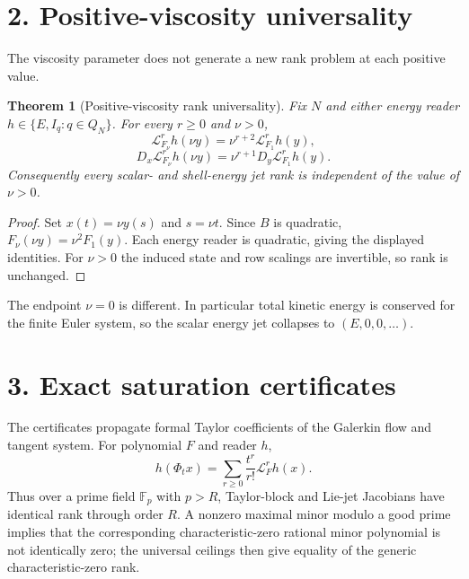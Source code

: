 \documentclass[10pt,leqno,twoside]{article}
\newcommand{\F}{\mathbb F}
\newcommand{\Lie}{\mathcal L}
\theoremstyle{plain}
\newtheorem{theorem}{Theorem}
\theoremstyle{remark}
\begin{document}
\section*{2. Positive-viscosity universality}

The viscosity parameter does not generate a new rank problem at each positive value.

\begin{theorem}[Positive-viscosity rank universality]
Fix $N$ and either energy reader $h\in\{E,I_q:q\in Q_N\}$.  For every $r\ge0$ and $\nu>0$,
\begin{equation}
\Lie_{F_\nu}^r h(\nu y)=\nu^{r+2}\Lie_{F_1}^r h(y),
\end{equation}
\begin{equation}
D_x\Lie_{F_\nu}^r h(\nu y)=\nu^{r+1}D_y\Lie_{F_1}^r h(y).
\end{equation}
Consequently every scalar- and shell-energy jet rank is independent of the value of
$\nu>0$.
\end{theorem}

\begin{proof}
Set $x(t)=\nu y(s)$ and $s=\nu t$.  Since $B$ is quadratic,
$F_\nu(\nu y)=\nu^2F_1(y)$.  Each energy reader is quadratic, giving the displayed identities.
For $\nu>0$ the induced state and row scalings are invertible, so rank is unchanged.
\end{proof}

The endpoint $\nu=0$ is different.  In particular total kinetic energy is conserved for the
finite Euler system, so the scalar energy jet collapses to $(E,0,0,\ldots)$.

\section*{3. Exact saturation certificates}

The certificates propagate formal Taylor coefficients of the Galerkin flow and tangent
system.  For polynomial $F$ and reader $h$,
\begin{equation}
h(\Phi_t x)=\sum_{r\ge0}\frac{t^r}{r!}\Lie_F^r h(x).
\end{equation}
Thus over a prime field $\F_p$ with $p>R$, Taylor-block and Lie-jet Jacobians have identical
rank through order $R$.  A nonzero maximal minor modulo a good prime implies that the
corresponding characteristic-zero rational minor polynomial is not identically zero; the
universal ceilings then give equality of the generic characteristic-zero rank.
\end{document}
